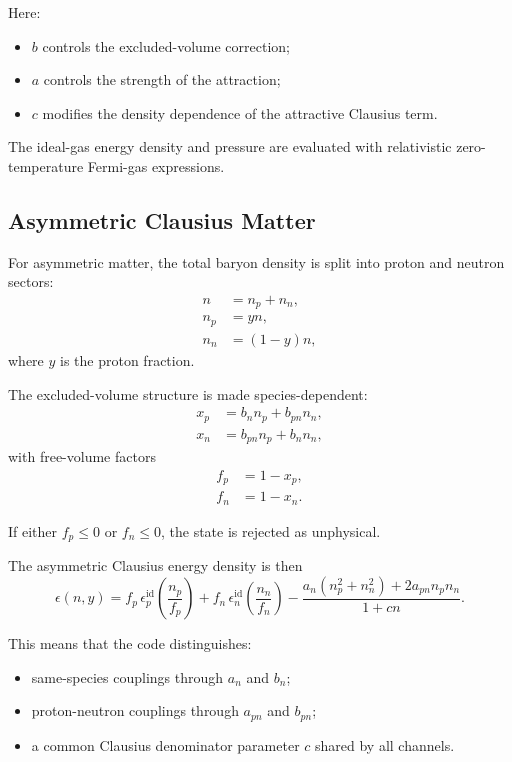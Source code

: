 \documentclass[11pt]{article}
\begin{document}
Here:
\begin{itemize}
\item $b$ controls the excluded-volume correction;
\item $a$ controls the strength of the attraction;
\item $c$ modifies the density dependence of the attractive Clausius term.
\end{itemize}

The ideal-gas energy density and pressure are evaluated with relativistic
zero-temperature Fermi-gas expressions.

\subsection{Asymmetric Clausius Matter}

For asymmetric matter, the total baryon density is split into proton and
neutron sectors:
\begin{align}
n &= n_p + n_n, \\
n_p &= y n, \\
n_n &= (1-y)n,
\end{align}
where $y$ is the proton fraction.

The excluded-volume structure is made species-dependent:
\begin{align}
x_p &= b_n n_p + b_{pn} n_n, \\
x_n &= b_{pn} n_p + b_n n_n,
\end{align}
with free-volume factors
\begin{align}
f_p &= 1 - x_p, \\
f_n &= 1 - x_n.
\end{align}

If either $f_p \le 0$ or $f_n \le 0$, the state is rejected as unphysical.

The asymmetric Clausius energy density is then
\begin{equation}
\epsilon(n,y)
= f_p \, \epsilon^{\mathrm{id}}_p\!\left(\frac{n_p}{f_p}\right)
+ f_n \, \epsilon^{\mathrm{id}}_n\!\left(\frac{n_n}{f_n}\right)
- \frac{a_n(n_p^2+n_n^2) + 2 a_{pn} n_p n_n}{1 + c n}.
\end{equation}

This means that the code distinguishes:
\begin{itemize}
\item same-species couplings through $a_n$ and $b_n$;
\item proton-neutron couplings through $a_{pn}$ and $b_{pn}$;
\item a common Clausius denominator parameter $c$ shared by all channels.
\end{itemize}
\end{document}
